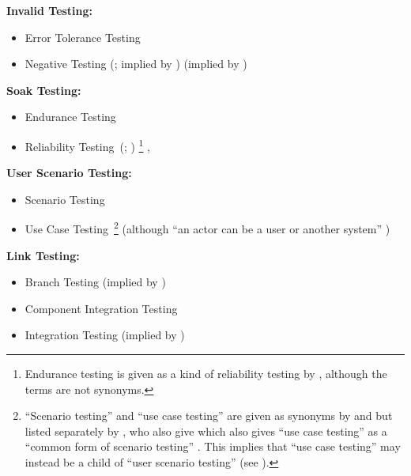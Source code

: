 \item \textbf{Invalid Testing:}
\begin{itemize}
    \item Error Tolerance Testing \citep[p.~45]{Kam2008}
    \item Negative Testing \ifnotpaper
              (\citealpISTQB{}; implied by \citealp[p.~10]{IEEE2021}) \else
              \citep{ISTQB} (implied by \citep[p.~10]{IEEE2021}) \fi
\end{itemize}
\item \textbf{Soak Testing:}
\begin{itemize}
    \item Endurance Testing \citep[p.~39]{IEEE2021}
    \item Reliability Testing\ifnotpaper\
              (\citealp[Tab.~2]{Gerrard2000a}; \citeyear[Tab.~1,~p.~26]{Gerrard2000b})
          \else\footnote{Endurance testing is given as a kind of reliability
                  testing by \citet[p.~55]{Firesmith2015}, although the terms
                  are not synonyms.} \citep[Tab.~1,~p.~26]{Gerrard2000b},
              \citep[Tab.~2]{Gerrard2000a}\fi
\end{itemize}
\item \textbf{User Scenario Testing:}
\begin{itemize}
    \item Scenario Testing \citepISTQB{}
    \item Use Case Testing\ifnotpaper\ \else\footnote{``Scenario testing'' and
                  ``use case testing'' are given as synonyms by \citepISTQB{}
                  and \citep[pp.~47-49]{Kam2008}
                  but listed separately by \citep[p.~22]{IEEE2022}, \ifnotpaper who
                      also give \else which also gives \fi ``use case testing'' as a
                  ``common form of scenario testing'' \citep[p.~20]{IEEE2021}.
                  This implies that ``use case testing'' may instead be a child of
                  ``user scenario testing'' (see \Cref{tab:parSyns}).}\fi
          \citep[p.~48]{Kam2008} (although ``an actor can be a user or another
          system'' \citep[p.~20]{IEEE2021})
\end{itemize}
\item \textbf{Link Testing:}
\begin{itemize}
    \item Branch Testing (implied by \citealp[p.~24]{IEEE2021})
    \item Component Integration Testing \citep[p.~45]{Kam2008}
    \item Integration Testing (implied by \citealp[p.~13]{Gerrard2000a})
\end{itemize}